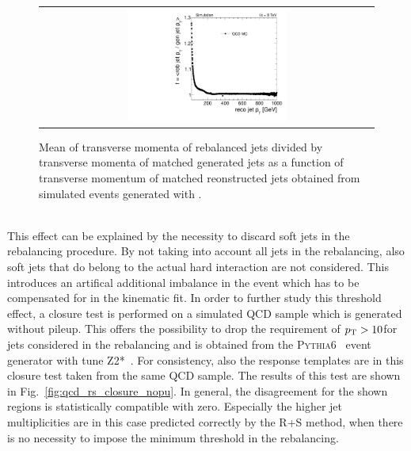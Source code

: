 \begin{figure}[!t]
  \centering
  \begin{tabular}{c}
                \includegraphics[width=0.49\textwidth]{figures/RebalanceCorrectionFactors_DR53X_chsJets_TuneZ2star_withoutPUReweighting_pt10_vsRecoMadgraph.pdf} 
  \end{tabular}
  \caption{Mean of transverse momenta of rebalanced jets divided by transverse momenta of matched generated jets as a function of transverse momentum of matched reonstructed jets obtained from simulated events generated with \madgraph.}
  \label{fig:qcd_rs_rebfactor}
\end{figure}
\\
This effect can be explained by the necessity to discard soft jets in the rebalancing procedure. By not taking into account all jets in the rebalancing, also soft jets that do belong to the actual hard interaction are not considered. This introduces an artifical additional imbalance in the event which has to be compensated for in the kinematic fit. In order to further study this threshold effect, a closure test is performed on a simulated QCD sample which is generated without pileup. This offers the possibility to drop the requirement of $p_{\text{T}} > 10$\gev for jets considered in the rebalancing and is obtained from the \textsc{Pythia6}~\cite{Sjostrand:2006za} event generator with tune Z2*~\cite{Chatrchyan:2013gfi}. For consistency, also the response templates are in this closure test taken from the same QCD sample. The results of this test are shown in Fig.~\ref{fig:qcd_rs_closure_nopu}. In general, the disagreement for the shown regions is statistically compatible with zero. Especially the higher jet multiplicities are in this case predicted correctly by the R+S method, when there is no necessity to impose the minimum \pt threshold in the rebalancing. 
